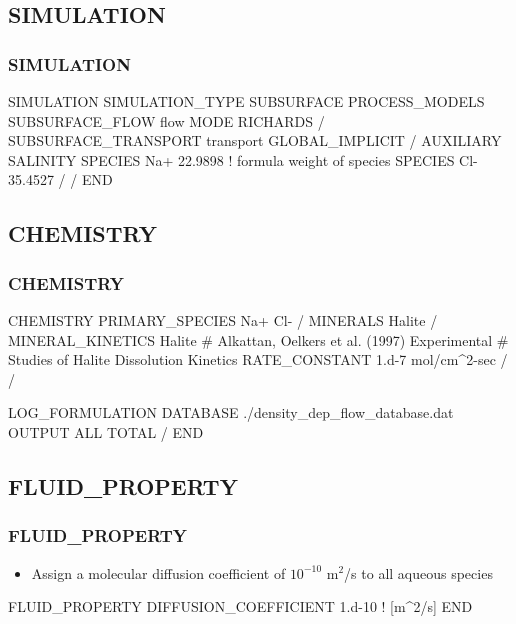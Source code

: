 \documentclass{beamer}
\newcommand\bluecomment[1]{{{\color{blue} #1}}}
\newcommand\magentacomment[1]{{{\color{magenta} #1}}}
\begin{document}
\subsection{SIMULATION}
\begin{frame}\frametitle{SIMULATION}

\begin{semiverbatim}
SIMULATION
  SIMULATION_TYPE SUBSURFACE
  PROCESS_MODELS
    SUBSURFACE_FLOW flow
      MODE RICHARDS
    /
    SUBSURFACE_TRANSPORT transport
      GLOBAL_IMPLICIT
    /
    \magentacomment{AUXILIARY SALINITY
      SPECIES Na+ 22.9898    \bluecomment{! formula weight of species}
      SPECIES Cl- 35.4527
    /}
  /
END
\end{semiverbatim}

\end{frame}

\subsection{CHEMISTRY}

\begin{frame}\frametitle{CHEMISTRY}
\begin{semiverbatim}
CHEMISTRY
  PRIMARY_SPECIES
    Na+
    Cl-
  /
  MINERALS
    Halite
  /
  MINERAL_KINETICS
    Halite
      \bluecomment{# Alkattan, Oelkers et al. (1997) Experimental
      #  Studies of Halite Dissolution Kinetics}
      RATE_CONSTANT 1.d-7 mol/cm^2-sec 
    /
  /
  
  LOG_FORMULATION
  DATABASE ./density_dep_flow_database.dat
  OUTPUT
    ALL
    TOTAL
  /
END
\end{semiverbatim}

\end{frame}

\subsection{FLUID\_PROPERTY}

\begin{frame}\frametitle{FLUID\_PROPERTY}

\begin{itemize}
  \item Assign a molecular diffusion coefficient of $10^{-10}$ m$^2$/s to all aqueous species
\end{itemize}

\begin{semiverbatim}
  
FLUID_PROPERTY
  DIFFUSION_COEFFICIENT 1.d-10   \bluecomment{! [m^2/s]}
END
\end{semiverbatim}

\end{frame}
\end{document}
